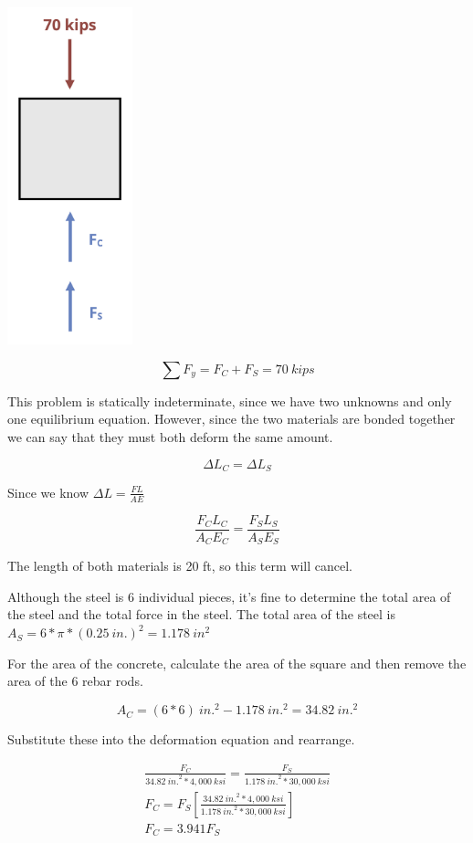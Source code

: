 \documentclass[
  letterpaper,
  DIV=11,
  numbers=noendperiod]{scrreprt}
\begin{document}
\begin{tcolorbox}
\begin{tcolorbox}
\begin{center}
\includegraphics[width=1.42708in,height=\textheight]{images/PNGs/Example 5.7 copy.png}
\end{center}

\[
\sum F_y= F_C+F_S=70{~kips}
\]

This problem is statically indeterminate, since we have two unknowns and
only one equilibrium equation. However, since the two materials are
bonded together we can say that they must both deform the same amount.

\[
\Delta L_C=\Delta L_S
\]

Since we know \(\Delta L=\frac{F L}{A E}\)

\[
\frac{F_C L_C}{A_C E_C}=\frac{F_S L_S}{A_S E_S}
\]

The length of both materials is 20 ft, so this term will cancel.

Although the steel is 6 individual pieces, it's fine to determine the
total area of the steel and the total force in the steel. The total area
of the steel is \(A_S=6 * \pi * (0.25{~in.})^2=1.178{~in}^2\)

For the area of the concrete, calculate the area of the square and then
remove the area of the 6 rebar rods.

\[
A_C=(6 * 6){~in.}^2-1.178{~in.^2}=34.82{~in.}^2
\]

Substitute these into the deformation equation and rearrange.

\[
\begin{gathered}
\frac{F_C}{34.82{~in.}^2 * 4,000{~ksi}}=\frac{F_S}{1.178{~in.}^2 * 30,000{~ksi}} \\
F_C=F_S\left[\frac{34.82{~in.}^2 * 4,000{~ksi}}{1.178{~in.}^2 * 30,000{~ksi}}\right] \\
F_C=3.941 F_S
\end{gathered}
\]


\end{tcolorbox}
\end{tcolorbox}
\end{document}
